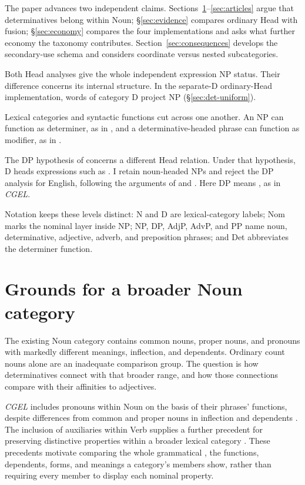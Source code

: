 \documentclass[12pt]{article}
\begin{document}
The paper advances two independent claims. Sections~\ref{sec:proposal}--\ref{sec:articles} argue that determinatives belong within Noun; §\ref{sec:evidence} compares ordinary Head with fusion; §\ref{sec:economy} compares the four implementations and asks what further economy the taxonomy contributes. Section~\ref{sec:consequences} develops the secondary-use schema and considers coordinate versus nested subcategories.

Both Head analyses give the whole independent expression NP status. Their difference concerns its internal structure. In the separate-D ordinary-Head implementation, words of category D project NP (§\ref{sec:det-uniform}).

Lexical categories and syntactic functions cut across one another. An NP can function as determiner, as in , and a determinative-headed phrase can function as modifier, as in  \citep{payne2010,pullummiller2022nps}.

The DP hypothesis of \textcite{abney1987} concerns a different Head relation. Under that hypothesis, D heads expressions such as . I retain noun-headed NPs and reject the DP analysis for English, following the arguments of \textcite{pullummiller2022nps} and \textcite{bruening2020nominal}. Here DP means , as in \textit{CGEL}.

Notation keeps these levels distinct: N and D are lexical-category labels; Nom marks the nominal layer inside NP; NP, DP, AdjP, AdvP, and PP name noun, determinative, adjective, adverb, and preposition phrases; and Det abbreviates the determiner function.

\section{Grounds for a broader Noun category}\label{sec:proposal}

The existing Noun category contains common nouns, proper nouns, and pronouns with markedly different meanings, inflection, and dependents. Ordinary count nouns alone are an inadequate comparison group. The question is how determinatives connect with that broader range, and how those connections compare with their affinities to adjectives.

\textit{CGEL} includes pronouns within Noun on the basis of their phrases' functions, despite differences from common and proper nouns in inflection and dependents \citep[327--328]{huddleston2002}. The inclusion of auxiliaries within Verb supplies a further precedent for preserving distinctive properties within a broader lexical category \citep{pullumwilson1977}. These precedents motivate comparing the whole grammatical , the functions, dependents, forms, and meanings a category's members show, rather than requiring every member to display each nominal property.
\end{document}
